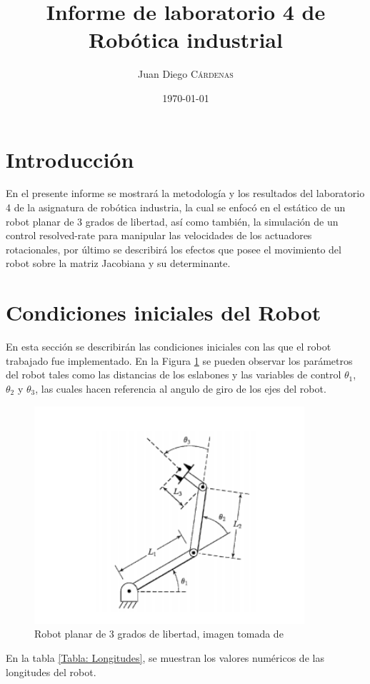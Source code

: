 \documentclass[11pt]{report} %
\title{Informe de laboratorio 4 de Robótica industrial} %
\author{Juan Diego \textsc{Cárdenas}} %
\date{\today} %
\begin{document}
	\maketitle

	\section{Introducción}
	En el presente informe se mostrará la metodología y los resultados del laboratorio 4 de la asignatura de robótica industria, la cual se enfocó en el estático de un robot planar de 3 grados de libertad, así como también, la simulación de un control resolved-rate para manipular las velocidades de los actuadores rotacionales, por último se describirá los efectos que posee el movimiento del robot sobre la matriz Jacobiana y su determinante.

	\section{Condiciones iniciales del Robot}
	En esta sección se describirán las condiciones iniciales con las que el robot trabajado fue implementado. En la Figura \ref{Figura: Robot} se pueden observar los parámetros del robot tales como las distancias de los eslabones y las variables de control ${\theta}_{1}$, ${\theta}_{2}$ y ${\theta}_{3}$, las cuales hacen referencia al angulo de giro de los ejes del robot.

	\begin{figure}[H]
		\centering
		\includegraphics[width=10cm]{Imagenes/Robotinit.png}
		\caption{Robot planar de 3 grados de libertad, imagen tomada de \cite{Jaramillo2015}}
		\label{Figura: Robot}
	\end{figure}

	En la tabla \ref{Tabla: Longitudes}, se muestran los valores numéricos de las longitudes del robot.
\end{document}
